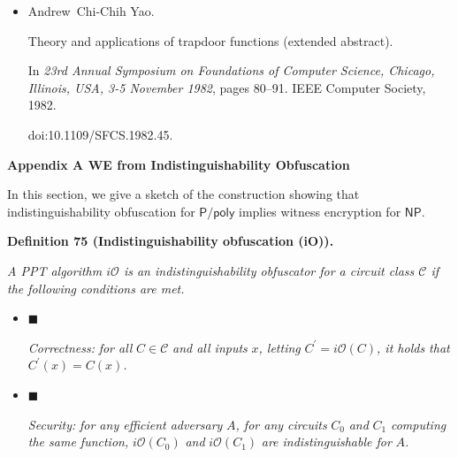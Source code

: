 \begin{itemize}
\emph{Commun. ACM}, 27(11):1134–1142, 1984.


doi:10.1145/1968.1972.





\item[] 
[47]

Andrew Chi-Chih Yao.


Theory and applications of trapdoor functions (extended abstract).


In \emph{23rd Annual Symposium on Foundations of Computer Science,
Chicago, Illinois, USA, 3-5 November 1982}, pages 80–91. IEEE Computer
Society, 1982.


doi:10.1109/SFCS.1982.45.





\end{itemize}




\par\medskip\noindent\textbf{
Appendix A WE from Indistinguishability Obfuscation}\par




In this section, we give a sketch of the construction showing that indistinguishability obfuscation for ${\mathsf{P}}/{\mathsf{poly}}$ implies witness encryption for ${\mathsf{NP}}$.\par





\par\medskip\noindent\textbf{
\textbf{Definition 75}\textbf{ }(Indistinguishability obfuscation (iO))\textbf{.}
}\par



\emph{A PPT algorithm $i\mathcal{O}$ is an indistinguishability obfuscator for a circuit class $\mathcal{C}$ if the following conditions are met.}\par


\begin{itemize}


\item[] 
$\blacksquare$ 


\emph{Correctness:}\emph{ for all }$C\in\mathcal{C}$\emph{ and all inputs }$x$\emph{, letting }$C^{\prime}=i\mathcal{O}(C)$\emph{, it holds that }$C^{\prime}(x)=C(x)$\emph{.}\par





\item[] 
$\blacksquare$ 


\emph{Security:}\emph{ for any efficient adversary }$A$\emph{, for any circuits }$C_{0}$\emph{ and }$C_{1}$\emph{ computing the same function, }$i\mathcal{O}(C_{0})$\emph{ and }$i\mathcal{O}(C_{1})$\emph{ are indistinguishable for }$A$\emph{.}\par





\end{itemize}



